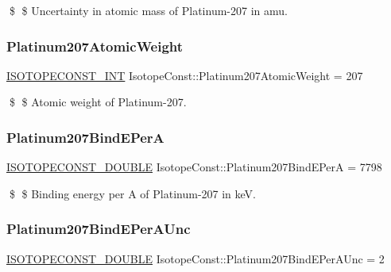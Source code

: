 \$ \$ Uncertainty in atomic mass of Platinum-\/207 in amu. \mbox{\label{group___isotope_const-_platinum-_pt207_ga89ca2a181947d930656b6fb4dd71f2d5}} 
\subsubsection{\texorpdfstring{Platinum207\+Atomic\+Weight}{Platinum207AtomicWeight}}
{\footnotesize\ttfamily \mbox{\hyperlink{group___isotope_const-_macros_ga5f18360b3e99483a35c32d789e62621c}{I\+S\+O\+T\+O\+P\+E\+C\+O\+N\+S\+T\+\_\+\+I\+NT}} Isotope\+Const\+::\+Platinum207\+Atomic\+Weight = 207}

\$ \$ Atomic weight of Platinum-\/207. \mbox{\label{group___isotope_const-_platinum-_pt207_ga53363e21d866e028f3d998eb1b07a14c}} 
\subsubsection{\texorpdfstring{Platinum207\+Bind\+E\+PerA}{Platinum207BindEPerA}}
{\footnotesize\ttfamily \mbox{\hyperlink{group___isotope_const-_macros_ga8f45a7272ce02c0b4c65c44636ed719a}{I\+S\+O\+T\+O\+P\+E\+C\+O\+N\+S\+T\+\_\+\+D\+O\+U\+B\+LE}} Isotope\+Const\+::\+Platinum207\+Bind\+E\+PerA = 7798}

\$ \$ Binding energy per A of Platinum-\/207 in keV. \mbox{\label{group___isotope_const-_platinum-_pt207_gad6f3cf58387f84b5664ef1d31aa0ddb4}} 
\subsubsection{\texorpdfstring{Platinum207\+Bind\+E\+Per\+A\+Unc}{Platinum207BindEPerAUnc}}
{\footnotesize\ttfamily \mbox{\hyperlink{group___isotope_const-_macros_ga8f45a7272ce02c0b4c65c44636ed719a}{I\+S\+O\+T\+O\+P\+E\+C\+O\+N\+S\+T\+\_\+\+D\+O\+U\+B\+LE}} Isotope\+Const\+::\+Platinum207\+Bind\+E\+Per\+A\+Unc = 2}

